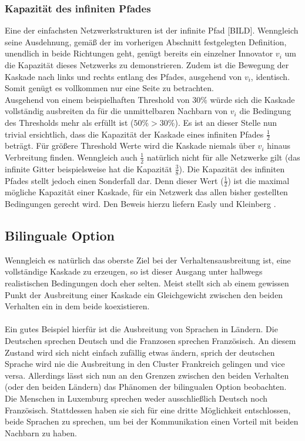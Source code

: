 \documentclass[12pt]{article}
\begin{document}
\subsubsection{Kapazität des infiniten Pfades}
Eine der einfachsten Netzwerkstrukturen ist der infinite Pfad [BILD]. Wenngleich seine Ausdehnung, gemäß der im vorherigen Abschnitt festgelegten Definition, unendlich in beide Richtungen geht, genügt bereits ein einzelner Innovator $v_i$ um die Kapazität dieses Netzwerks zu demonstrieren. Zudem ist die Bewegung der Kaskade nach links und rechts entlang des Pfades, ausgehend von $v_i$, identisch. Somit genügt es vollkommen nur eine Seite zu betrachten.\\
Ausgehend von einem beispielhaften Threshold von $30\%$ würde sich die Kaskade vollständig ausbreiten da für die unmittelbaren Nachbarn von $v_i$ die Bedingung des Thresholds mehr als erfüllt ist ($50\% > 30\%$). Es ist an dieser Stelle nun trivial ersichtlich, dass die Kapazität der Kaskade eines infiniten Pfades $\frac{1}{2}$ beträgt. Für größere Threshold Werte wird die Kaskade niemals über $v_i$ hinaus Verbreitung finden. Wenngleich auch $\frac{1}{2}$ natürlich nicht für alle Netzwerke gilt (das infinite Gitter beispielsweise hat die Kapazität $\frac{3}{8}$). Die Kapazität des infiniten Pfades stellt jedoch einen Sonderfall dar. Denn dieser Wert ($\frac{1}{2}$) ist die maximal mögliche Kapazität einer Kaskade, für ein Netzwerk das allen bisher gestellten Bedingungen gerecht wird. Den Beweis hierzu liefern Easly und Kleinberg \cite{Easly10}. 

\subsection{Bilinguale Option}
Wenngleich es natürlich das oberste Ziel bei der Verhaltensausbreitung ist, eine vollständige Kaskade zu erzeugen, so ist dieser Ausgang unter halbwegs realistischen Bedingungen doch eher selten. Meist stellt sich ab einem gewissen Punkt der Ausbreitung einer Kaskade ein Gleichgewicht zwischen den beiden Verhalten ein in dem beide koexistieren.\\\\
Ein gutes Beispiel hierfür ist die Ausbreitung von Sprachen in Ländern. Die Deutschen sprechen Deutsch und die Franzosen sprechen Französisch. An diesem Zustand wird sich nicht einfach zufällig etwas ändern, sprich der deutschen Sprache wird nie die Ausbreitung in den Cluster Frankreich gelingen und vice versa. Allerdings lässt sich nun an den Grenzen zwischen den beiden Verhalten (oder den beiden Ländern) das Phänomen der bilingualen Option beobachten. Die Menschen in Luxemburg sprechen weder ausschließlich Deutsch noch Französisch. Stattdessen haben sie sich für eine dritte Möglichkeit entschlossen, beide Sprachen zu sprechen, um bei der Kommunikation einen Vorteil mit beiden Nachbarn zu haben.
\end{document}
